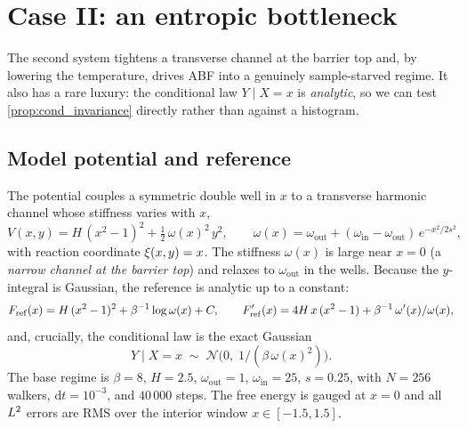 \section{Case II: an entropic bottleneck}
\label{sec:case_eb}

The second system tightens a transverse channel at the barrier top and, by
lowering the temperature, drives ABF into a genuinely sample-starved regime. It
also has a rare luxury: the conditional law $Y\mid X=x$ is \emph{analytic}, so we
can test \cref{prop:cond_invariance} directly rather than against a histogram.

\subsection{Model potential and reference}
The potential couples a symmetric double well in $x$ to a transverse harmonic
channel whose stiffness varies with $x$,
\begin{equation}
  V(x,y) = H\,(x^2-1)^2 + \tfrac12\,\omega(x)^2\,y^2,\qquad
  \omega(x) = \omega_{\mathrm{out}} +
    (\omega_{\mathrm{in}}-\omega_{\mathrm{out}})\,e^{-x^2/2s^2},
  \label{eq:eb_potential}
\end{equation}
with reaction coordinate $\xi(x,y)=x$. The stiffness $\omega(x)$ is large near
$x=0$ (a \emph{narrow channel at the barrier top}) and relaxes to
$\omega_{\mathrm{out}}$ in the wells. Because the $y$-integral is Gaussian, the
reference is analytic up to a constant:
\begin{equation}
  F_{\mathrm{ref}}(x) = H\,(x^2-1)^2 + \beta^{-1}\log\omega(x) + C,\qquad
  F'_{\mathrm{ref}}(x) = 4H\,x\,(x^2-1) + \beta^{-1}\,\omega'(x)/\omega(x),
  \label{eq:eb_ref}
\end{equation}
and, crucially, the conditional law is the exact Gaussian
\begin{equation}
  Y\mid X=x \;\sim\; \mathcal N\!\bigl(0,\;1/(\beta\,\omega(x)^2)\bigr).
  \label{eq:eb_conditional}
\end{equation}
The base regime is $\beta=8$, $H=2.5$, $\omega_{\mathrm{out}}=1$,
$\omega_{\mathrm{in}}=25$, $s=0.25$, with $N=256$ walkers, $\mathrm{d}t=10^{-3}$,
and $40\,000$ steps. The free energy is gauged at $x=0$ and all $L^2$ errors are
RMS over the interior window $x\in[-1.5,1.5]$.

